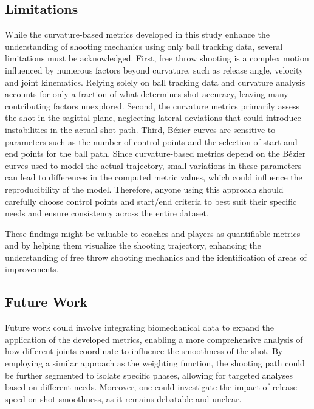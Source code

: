 \documentclass{article}
\begin{document}
    \subsection{Limitations}

      While the curvature-based metrics developed in this study enhance the understanding of shooting mechanics using only ball tracking data, several limitations must be acknowledged. First, free throw shooting is a complex motion influenced by numerous factors beyond curvature, such as release angle, velocity and joint kinematics. Relying solely on ball tracking data and curvature analysis accounts for only a fraction of what determines shot accuracy, leaving many contributing factors unexplored. Second, the curvature metrics primarily assess the shot in the sagittal plane, neglecting lateral deviations that could introduce instabilities in the actual shot path. Third, Bézier curves are sensitive to parameters such as the number of control points and the selection of start and end points for the ball path. Since curvature-based metrics depend on the Bézier curves used to model the actual trajectory, small variations in these parameters can lead to differences in the computed metric values, which could influence the reproducibility of the model. Therefore, anyone using this approach should carefully choose control points and start/end criteria to best suit their specific needs and ensure consistency across the entire dataset.

      These findings might be valuable to coaches and players as quantifiable metrics and by helping them visualize the shooting trajectory, enhancing the understanding of free throw shooting mechanics and the identification of areas of improvements.

    \subsection{Future Work}
    
      Future work could involve integrating biomechanical data to expand the application of the developed metrics, enabling a more comprehensive analysis of how different joints coordinate to influence the smoothness of the shot. By employing a similar approach as the weighting function, the shooting path could be further segmented to isolate specific phases, allowing for targeted analyses based on different needs. Moreover, one could investigate the impact of release speed on shot smoothness, as it remains debatable and unclear.

  
  
\end{document}
